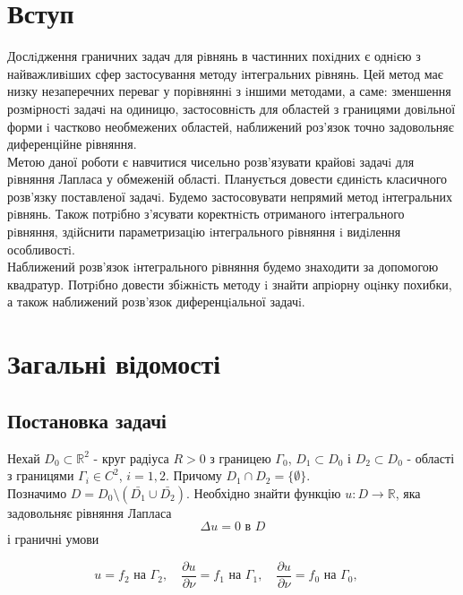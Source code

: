\documentclass[a4 paper,12pt,ukrainian]{report}
\begin{document}
\chapter*{\bf{Вступ}}
\hspace*{\parindent}Дослiдження граничних задач для рiвнянь в частинних похiдних є однiєю з
найважливiших сфер застосування методу iнтегральних рiвнянь. Цей метод має низку
незаперечних переваг у порiвняннi з iншими методами, а саме: зменшення розмiрностi
задачi на одиницю, застосовнiсть для областей з границями довiльної форми i частково
необмежених областей, наближений роз'язок точно задовольняє диференційне рівняння.\\
\hspace*{\parindent}Метою даної роботи є навчитися чисельно розв'язувати крайовi задачi для
рiвняння Лапласа у обмеженій області. Планується довести єдинiсть класичного
розв'язку поставленої задачi. Будемо застосовувати непрямий метод iнтегральних рiвнянь. Також потрiбно
з'ясувати коректнiсть отриманого iнтегрального рiвняння, здiйснити
параметризацiю iнтегрального рiвняння i видiлення особливостi.\\
\hspace*{\parindent}Наближений розв'язок iнтегрального рiвняння будемо знаходити за допомогою квадратур. Потрiбно довести збiжнiсть методу i
знайти апрiорну оцiнку похибки, а також наближений розв’язок диференцiальної задачi.
\chapter{Загальні відомості}
\section{Постановка задачі}
\hspace*{\parindent}Нехай $D_0\subset \mathbb{R}^2$ - круг радіуса $R>0$ з границею $\Gamma_0$, $D_1\subset D_0$ і $D_2\subset D_0$ - області з границями $\Gamma_i\in C^2$, $i=1,2$. Причому $D_1\cap D_2=\{\emptyset\}$.\\ 
\hspace*{\parindent}Позначимо $D=D_0\setminus (\bar{D_1}\cup\bar{D_2})$. Необхідно знайти функцію $u:D \rightarrow \mathbb{R}$, яка задовольняє рівняння Лапласа
\begin{equation}
\Delta u=0\text{ в }D
\end{equation}
і граничні умови 

\begin{equation}
		u = f_2 \mbox{  на  }  \Gamma_2 ,\quad
		\frac{\partial u}{\partial \nu} = f_1 \mbox{  на  }  \Gamma_1 ,\quad
		\frac{\partial u}{\partial \nu} = f_0 \mbox{  на  } \Gamma_0 ,\quad
\end{equation}
\end{document}
